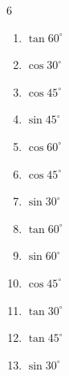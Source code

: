 \begin{multicols}{6}
\begin{enumerate}
  \item $\displaystyle \tan{60^\circ}$


\columnbreak %

  \item $\displaystyle \cos{30^\circ}$


  \item $\displaystyle \cos{45^\circ}$


  \item $\displaystyle \sin{45^\circ}$


  \item $\displaystyle \cos{60^\circ}$


  \item $\displaystyle \cos{45^\circ}$


  \item $\displaystyle \sin{30^\circ}$


  \item $\displaystyle \tan{60^\circ}$


  \item $\displaystyle \sin{60^\circ}$


  \item $\displaystyle \cos{45^\circ}$


  \item $\displaystyle \tan{30^\circ}$


  \item $\displaystyle \tan{45^\circ}$

        \phantom{$\displaystyle =1$}

  \item $\displaystyle \sin{30^\circ}$


\end{enumerate}
\end{multicols}
